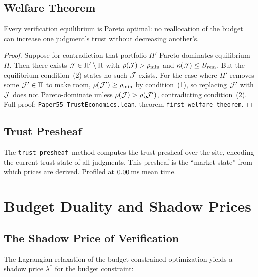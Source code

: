\documentclass[11pt]{article}
\newcommand{\VerifCost}{\kappa}
\newcommand{\TrustReturn}{\rho}
\newcommand{\TrustPresheaf}{\texttt{trust\_presheaf}}
\newcommand{\Shadow}{\lambda}
\begin{document}
\subsection{Welfare Theorem}

\begin{theorem}\label{thm:welfare}
Every verification equilibrium is Pareto optimal: no reallocation
of the budget can increase one judgment's trust without decreasing
another's.
\end{theorem}

\begin{proof}
Suppose for contradiction that portfolio $\Pi'$ Pareto-dominates
equilibrium $\Pi$.  Then there exists $\mathcal{J} \in \Pi' \setminus \Pi$
with $\TrustReturn(\J) > \TrustReturn_{\min}$ and
$\VerifCost(\J) \leq B_{\text{rem}}$.  But the equilibrium condition~(2)
states no such $\mathcal{J}$ exists.  For the case where $\Pi'$ removes some
$\mathcal{J}' \in \Pi$ to make room, $\TrustReturn(\J') \geq \TrustReturn_{\min}$
by condition~(1), so replacing $\mathcal{J}'$ with $\mathcal{J}$ does not Pareto-dominate
unless $\TrustReturn(\J) > \TrustReturn(\J')$, contradicting condition~(2).
Full proof:
\texttt{Paper55\_TrustEconomics.lean}, theorem
\texttt{first\_welfare\_theorem}.
\end{proof}

\subsection{Trust Presheaf}
The \TrustPresheaf\ method computes the trust presheaf over the
site, encoding the current trust state of all judgments.  This
presheaf is the ``market state'' from which prices are derived.
Profiled at $0.00$\,ms mean time.

\section{Budget Duality and Shadow Prices}\label{sec:duality}

\subsection{The Shadow Price of Verification}

The Lagrangian relaxation of the budget-constrained optimization
yields a shadow price $\Shadow^*$ for the budget constraint:
\end{document}
